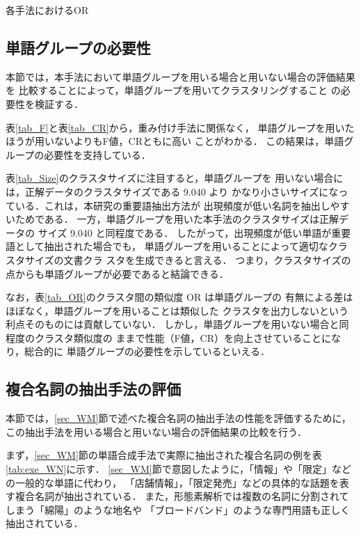 \documentclass[japanese]{jnlp_1.4}
\begin{document}
{\begin{table}[t]
    \caption{各手法におけるOR} \label{tab_OR}

\vspace{-1\baselineskip}
\end{table}


\subsection{単語グループの必要性} \label{subsec:necessity}

本節では，本手法において単語グループを用いる場合と用いない場合の評価結果を
比較することによって，単語グループを用いてクラスタリングすること
の必要性を検証する．

表\ref{tab_F}と表\ref{tab_CR}から，重み付け手法に関係なく，
単語グループを用いたほうが用いないよりもF値，CRともに高い
ことがわかる．
この結果は，単語グループの必要性を支持している．

表\ref{tab_Size}のクラスタサイズに注目すると，単語グループを
用いない場合には，正解データのクラスタサイズである 9.040 より
かなり小さいサイズになっている．これは，本研究の重要語抽出方法が
出現頻度が低い名詞を抽出しやすいためである．
一方，単語グループを用いた本手法のクラスタサイズは正解データの
サイズ 9.040 と同程度である．
したがって，出現頻度が低い単語が重要語として抽出された場合でも，
単語グループを用いることによって適切なクラスタサイズの文書クラ
スタを生成できると言える．
つまり，クラスタサイズの点からも単語グループが必要であると結論できる．

なお，表\ref{tab_OR}のクラスタ間の類似度 OR は単語グループの
有無による差はほぼなく，単語グループを用いることは類似した
クラスタを出力しないという利点そのものには貢献していない．
しかし，単語グループを用いない場合と同程度のクラスタ類似度の
ままで性能（F値，CR）を向上させていることになり，総合的に
単語グループの必要性を示しているといえる．


\subsection{複合名詞の抽出手法の評価} \label{subsec:marge}

本節では，{\ref{sec_WM}}節で述べた複合名詞の抽出手法の性能を評価するために，
この抽出手法を用いる場合と用いない場合の評価結果の比較を行う．

まず，{\ref{sec_WM}}節の単語合成手法で実際に抽出された複合名詞の例を表{\ref{tab:exe_WN}}に示す．
{\ref{sec_WM}}節で意図したように，「情報」や「限定」などの一般的な単語に代わり，
「店舗情報」，「限定発売」などの具体的な話題を表す複合名詞が抽出されている．
また，形態素解析では複数の名詞に分割されてしまう「綿陽」のような地名や
「ブロードバンド」のような専門用語も正しく抽出されている．

}
\end{document}

